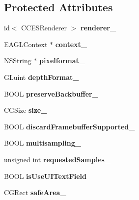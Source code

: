 \subsection*{Protected Attributes}
\begin{DoxyCompactItemize}
\item 
\mbox{\label{interfaceCCEAGLView_a22a1d2fa8e2350844d1504bb6c0a6abf}} 
id$<$ C\+C\+E\+S\+Renderer $>$ {\bfseries renderer\+\_\+}
\item 
\mbox{\label{interfaceCCEAGLView_abfbe4cc57a3f5594e310be8c442fa0af}} 
E\+A\+G\+L\+Context $\ast$ {\bfseries context\+\_\+}
\item 
\mbox{\label{interfaceCCEAGLView_a9fb005aa9ebeea7eba2fa1d530aaf967}} 
N\+S\+String $\ast$ {\bfseries pixelformat\+\_\+}
\item 
\mbox{\label{interfaceCCEAGLView_a38af4b0ea49390fd98b993f8217a9596}} 
G\+Luint {\bfseries depth\+Format\+\_\+}
\item 
\mbox{\label{interfaceCCEAGLView_a1de0e92856217b819a018ccfac25af56}} 
B\+O\+OL {\bfseries preserve\+Backbuffer\+\_\+}
\item 
\mbox{\label{interfaceCCEAGLView_a8c0a19ca887f0b99b4d9196a500323ab}} 
C\+G\+Size {\bfseries size\+\_\+}
\item 
\mbox{\label{interfaceCCEAGLView_a93e9a9aa12b945a3480e0b7ea92b96ec}} 
B\+O\+OL {\bfseries discard\+Framebuffer\+Supported\+\_\+}
\item 
\mbox{\label{interfaceCCEAGLView_afa9d1d88f2ab6e3dcec885f8d25f8e77}} 
B\+O\+OL {\bfseries multisampling\+\_\+}
\item 
\mbox{\label{interfaceCCEAGLView_a05257d982509d650f90736f95b8cc11f}} 
unsigned int {\bfseries requested\+Samples\+\_\+}
\item 
\mbox{\label{interfaceCCEAGLView_aaf873cd1b097fd3445919a2f0b7b7f72}} 
B\+O\+OL {\bfseries is\+Use\+U\+I\+Text\+Field}
\item 
\mbox{\label{interfaceCCEAGLView_aacf2907ca8e20028c59436c04e3e72b8}} 
C\+G\+Rect {\bfseries safe\+Area\+\_\+}
\end{DoxyCompactItemize}
